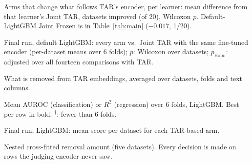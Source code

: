 \documentclass{article}
\begin{document}
\begin{table}[h]
\centering\small
\caption{Arms that change what follows TAR's encoder, per learner: mean difference from that learner's Joint TAR,
datasets improved (of 20), Wilcoxon $p$. Default-LightGBM Joint Frozen is in Table~\ref{tab:main} ($-0.017$, 1/20).}
\label{tab:learners}
\setlength{\tabcolsep}{3.5pt}
\end{table}

\begin{table}[h]
\centering\small
\caption{Final run, default LightGBM: every arm vs.\ Joint TAR with the same fine-tuned encoder (per-dataset means
over 6 folds); $p$: Wilcoxon over datasets;   $p_{\text{Holm}}$: adjusted over all fourteen comparisons with TAR.}
\label{tab:summary}
\setlength{\tabcolsep}{3.5pt}
\end{table}

\begin{table}[h]
\centering\small
\caption{What is removed from TAR embeddings, averaged over datasets, folds and text columns.}
\label{tab:removal}

\end{table}

\begin{table}[h]
\centering\small
\caption{Mean AUROC (classification) or $R^2$ (regression) over 6 folds, LightGBM. Best per row in bold.
$^\dagger$: fewer than 6 folds.}
\label{tab:main}

\end{table}

\begin{table}[h]
\centering\small
\caption{Final run, LightGBM: mean score per dataset for each TAR-based arm.}
\label{tab:finalmain}

\end{table}

\begin{table}[h]
\centering\small
\caption{Nested cross-fitted removal amount (five datasets). Every decision is made on rows the judging encoder never
saw.}
\label{tab:xf}

\end{table}
\end{document}

